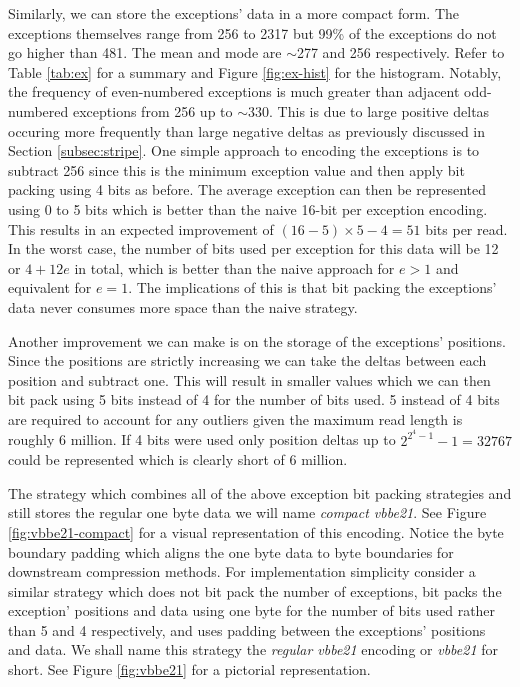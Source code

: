 Similarly, we can store the exceptions' data in a more compact form.
The exceptions themselves range from 256 to 2317 but 99\%
of the exceptions do not go higher than 481. The mean and mode are $\sim$277 and
256 respectively. Refer to Table \ref{tab:ex} for a summary and Figure
\ref{fig:ex-hist} for the histogram. Notably, the frequency of even-numbered
exceptions is much greater than adjacent odd-numbered exceptions from 256 up to
$\sim$330. This is due to large positive deltas occuring more frequently than
large negative deltas as previously discussed in Section \ref{subsec:stripe}.
One simple approach to encoding the exceptions is to subtract 256 since this is
the minimum exception value and then apply bit packing using 4 bits as before. The
average exception can then be represented using
0 to 5 bits which is better than the naive 16-bit per exception encoding. This
results in an expected improvement of $(16-5)\times 5-4=51$ bits per read.
In the worst case, the number of bits used per exception for this data will be 12
or $4 + 12e$ in total, which is better than the naive approach for $e>1$ and
equivalent for $e=1$. The implications of this is that bit packing the
exceptions' data never consumes more space than the naive strategy.



Another improvement we can make is on the storage of the exceptions' positions.
Since the positions are strictly increasing we can take the deltas between each
position and subtract one. This will result in smaller values which we can then
bit pack using 5 bits instead of 4 for the number of bits used.
5 instead of 4 bits are required to account for any outliers given the maximum
read length is roughly 6 million. If 4 bits were used only position deltas up to
$2^{2^{4}-1}-1=32767$ could be represented which is clearly short of 6 million.

The strategy which combines all of the above exception bit packing strategies
and still stores the regular one byte data we will name \textit{compact vbbe21}.
See Figure \ref{fig:vbbe21-compact} for a visual representation of this
encoding. Notice the byte boundary padding which aligns the one byte data to
byte boundaries for downstream compression methods. For implementation
simplicity consider a similar strategy which does not bit pack the number of
exceptions, bit packs the exception' positions and data using one byte for the
number of bits used rather than 5 and 4 respectively, and uses padding between
the exceptions' positions and data. We shall name this strategy the
\textit{regular vbbe21} encoding or \textit{vbbe21} for short. See Figure
\ref{fig:vbbe21} for a pictorial representation.

